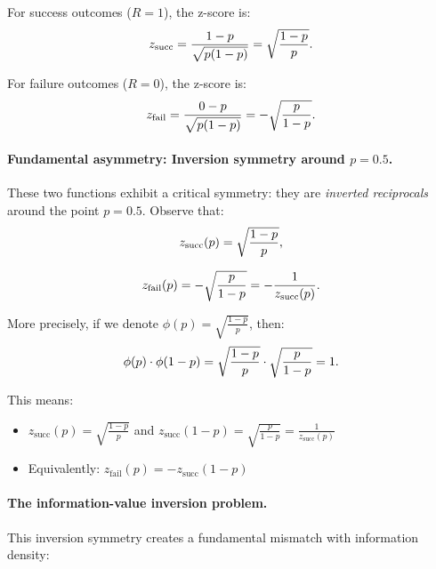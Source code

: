 \documentclass[11pt]{article}
\begin{document}
For success outcomes ($R=1$), the z-score is:
\begin{equation}
\small
z_{\text{succ}} = \frac{1 - p}{\sqrt{p(1-p)}} = \sqrt{\frac{1-p}{p}}.
\end{equation}

For failure outcomes ($R=0$), the z-score is:
\begin{equation}
\small
z_{\text{fail}} = \frac{0 - p}{\sqrt{p(1-p)}} = -\sqrt{\frac{p}{1-p}}.
\end{equation}

\paragraph{Fundamental asymmetry: Inversion symmetry around $p=0.5$.}
These two functions exhibit a critical symmetry: they are \textit{inverted reciprocals} around the point $p = 0.5$. Observe that:
\begin{equation}
\small
z_{\text{succ}}(p) = \sqrt{\frac{1-p}{p}},
\end{equation}

\begin{equation}
\small
z_{\text{fail}}(p) = -\sqrt{\frac{p}{1-p}} = -\frac{1}{z_{\text{succ}}(p)}.
\end{equation}

More precisely, if we denote $\phi(p) = \sqrt{\frac{1-p}{p}}$, then:
\begin{equation}
\small
\phi(p) \cdot \phi(1-p) = \sqrt{\frac{1-p}{p}} \cdot \sqrt{\frac{p}{1-p}} = 1.
\end{equation}

This means:
\begin{itemize}
\item $z_{\text{succ}}(p) = \sqrt{\frac{1-p}{p}}$ and $z_{\text{succ}}(1-p) = \sqrt{\frac{p}{1-p}} = \frac{1}{z_{\text{succ}}(p)}$
\item Equivalently: $z_{\text{fail}}(p) = -z_{\text{succ}}(1-p)$
\end{itemize}

\paragraph{The information-value inversion problem.}

This inversion symmetry creates a fundamental mismatch with information density:
\end{document}
